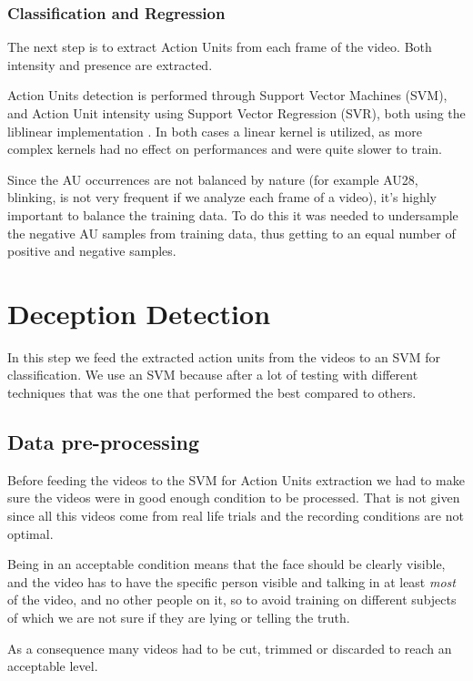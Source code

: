 \subsubsection{Classification and Regression}
The next step is to extract Action Units from each frame of the video. Both intensity and presence are extracted.

Action Units detection is performed through Support Vector Machines (SVM), and Action Unit intensity using Support Vector Regression (SVR), both using the liblinear implementation \cite{liblinear}. In both cases a linear kernel is utilized, as more complex kernels had no effect on performances and were quite slower to train.  

Since the AU occurrences are not balanced by nature (for example AU28, blinking, is not very frequent if we analyze each frame of a video), it's highly important to balance the training data. To do this it was needed to undersample the negative AU samples from training data, thus getting to an equal number of positive and negative samples.

\clearpage

\section{Deception Detection} \label{dec_det}
In this step we feed the extracted action units from the videos to an SVM for classification.
We use an SVM because after a lot of testing with different techniques that was the one that performed the best compared to others. 

\subsection{Data pre-processing}
Before feeding the videos to the SVM for Action Units extraction we had to make sure the videos were in good enough condition to be processed. That is not given since all this videos come from real life trials and the recording conditions are not optimal.

Being in an acceptable condition means that the face should be clearly visible, and the video has to have the specific person visible and talking in at least \textit{most} of the video, and no other people on it, so to avoid training on different subjects of which we are not sure if they are lying or telling the truth.

As a consequence many videos had to be cut, trimmed or discarded to reach an acceptable level.

